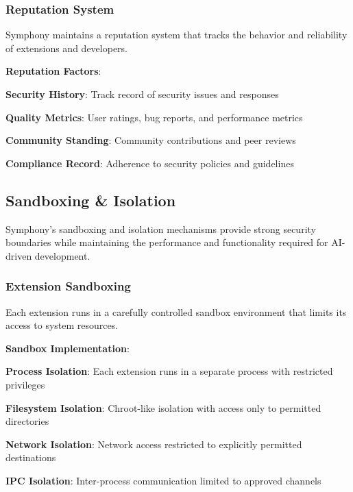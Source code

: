 \subsubsection*{Reputation System}

Symphony maintains a reputation system that tracks the behavior and reliability of extensions and developers.

\textbf{Reputation Factors}:
\begin{compactlist}
    \item \textbf{Security History}: Track record of security issues and responses
    \item \textbf{Quality Metrics}: User ratings, bug reports, and performance metrics
    \item \textbf{Community Standing}: Community contributions and peer reviews
    \item \textbf{Compliance Record}: Adherence to security policies and guidelines
\end{compactlist}

\subsection*{Sandboxing \& Isolation}

Symphony's sandboxing and isolation mechanisms provide strong security boundaries while maintaining the performance and functionality required for AI-driven development.

\subsubsection*{Extension Sandboxing}

Each extension runs in a carefully controlled sandbox environment that limits its access to system resources.

\textbf{Sandbox Implementation}:
\begin{compactlist}
    \item \textbf{Process Isolation}: Each extension runs in a separate process with restricted privileges
    \item \textbf{Filesystem Isolation}: Chroot-like isolation with access only to permitted directories
    \item \textbf{Network Isolation}: Network access restricted to explicitly permitted destinations
    \item \textbf{IPC Isolation}: Inter-process communication limited to approved channels
\end{compactlist}

